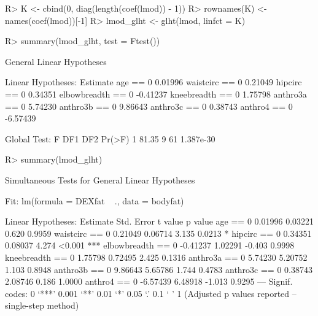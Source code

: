 \documentclass[landscape]{slides}
\begin{document}

\begin{Schunk}
\begin{Sinput}
R> K <- cbind(0, diag(length(coef(lmod)) - 1))
R> rownames(K) <- names(coef(lmod))[-1]
R> lmod_glht <- glht(lmod, linfct = K) 
\end{Sinput}
\end{Schunk}


\begin{Schunk}
\begin{Sinput}
R> summary(lmod_glht, test = Ftest())
\end{Sinput}
\begin{Soutput}
	 General Linear Hypotheses

Linear Hypotheses:
                  Estimate
age == 0           0.01996
waistcirc == 0     0.21049
hipcirc == 0       0.34351
elbowbreadth == 0 -0.41237
kneebreadth == 0   1.75798
anthro3a == 0      5.74230
anthro3b == 0      9.86643
anthro3c == 0      0.38743
anthro4 == 0      -6.57439

Global Test:
      F DF1 DF2    Pr(>F)
1 81.35   9  61 1.387e-30
\end{Soutput}
\end{Schunk}

\begin{Schunk}
\begin{Sinput}
R> summary(lmod_glht)
\end{Sinput}
\begin{Soutput}
	 Simultaneous Tests for General Linear Hypotheses

Fit: lm(formula = DEXfat ~ ., data = bodyfat)

Linear Hypotheses:
                  Estimate Std. Error t value p value    
age == 0           0.01996    0.03221   0.620  0.9959    
waistcirc == 0     0.21049    0.06714   3.135  0.0213 *  
hipcirc == 0       0.34351    0.08037   4.274  <0.001 ***
elbowbreadth == 0 -0.41237    1.02291  -0.403  0.9998    
kneebreadth == 0   1.75798    0.72495   2.425  0.1316    
anthro3a == 0      5.74230    5.20752   1.103  0.8948    
anthro3b == 0      9.86643    5.65786   1.744  0.4783    
anthro3c == 0      0.38743    2.08746   0.186  1.0000    
anthro4 == 0      -6.57439    6.48918  -1.013  0.9295    
---
Signif. codes:  0 ‘***’ 0.001 ‘**’ 0.01 ‘*’ 0.05 ‘.’ 0.1 ‘ ’ 1 
(Adjusted p values reported -- single-step method)
\end{Soutput}
\end{Schunk}
\end{document}
